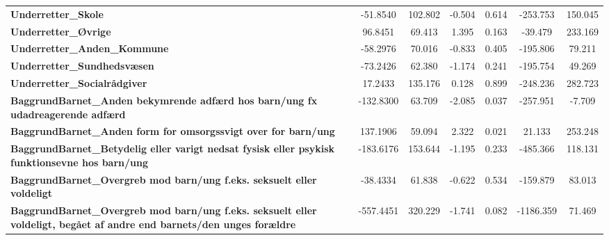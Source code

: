 \begin{center}
\begin{tabular}{lcccccc}
\textbf{Underretter\_Skole}                                                                                                    &     -51.8540  &      102.802     &    -0.504  &         0.614        &     -253.753    &      150.045     \\
\textbf{Underretter\_Øvrige}                                                                                                   &      96.8451  &       69.413     &     1.395  &         0.163        &      -39.479    &      233.169     \\
\textbf{Underretter\_Anden\_Kommune}                                                                                           &     -58.2976  &       70.016     &    -0.833  &         0.405        &     -195.806    &       79.211     \\
\textbf{Underretter\_Sundhedsvæsen}                                                                                            &     -73.2426  &       62.380     &    -1.174  &         0.241        &     -195.754    &       49.269     \\
\textbf{Underretter\_Socialrådgiver}                                                                                           &      17.2433  &      135.176     &     0.128  &         0.899        &     -248.236    &      282.723     \\
\textbf{BaggrundBarnet\_Anden bekymrende adfærd hos barn/ung fx udadreagerende adfærd}                                         &    -132.8300  &       63.709     &    -2.085  &         0.037        &     -257.951    &       -7.709     \\
\textbf{BaggrundBarnet\_Anden form for omsorgssvigt over for barn/ung}                                                         &     137.1906  &       59.094     &     2.322  &         0.021        &       21.133    &      253.248     \\
\textbf{BaggrundBarnet\_Betydelig eller varigt nedsat fysisk eller psykisk funktionsevne hos barn/ung}                         &    -183.6176  &      153.644     &    -1.195  &         0.233        &     -485.366    &      118.131     \\
\textbf{BaggrundBarnet\_Overgreb mod barn/ung f.eks. seksuelt eller voldeligt}                                                 &     -38.4334  &       61.838     &    -0.622  &         0.534        &     -159.879    &       83.013     \\
\textbf{BaggrundBarnet\_Overgreb mod barn/ung f.eks. seksuelt eller voldeligt, begået af andre end barnets/den unges forældre} &    -557.4451  &      320.229     &    -1.741  &         0.082        &    -1186.359    &       71.469     \\

\end{tabular}
\end{center}
